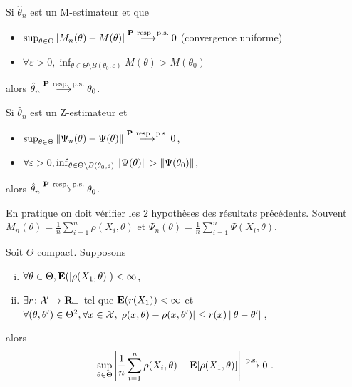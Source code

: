 	\begin{pop}
		Si $\hat{\theta}_n$ est un M-estimateur et que
		\begin{itemize}
			\item[\textbullet] $\sup_{\theta \in \Theta} \left\lvert M_n(\theta) - M(\theta)\right\rvert \overset{\mathbf{P}\ \text{resp. p.s.}}{\longrightarrow} 0$ (convergence uniforme)
			\item[\textbullet] $\forall \varepsilon > 0, \inf_{\theta \in \Theta \setminus B(\theta_0,\varepsilon)} M(\theta) > M(\theta_0)$
		\end{itemize}
		alors $\hat{\theta}_n \overset{\proba\ \text{resp. p.s.}}{\longrightarrow} \theta_0$.
	\end{pop}

	\begin{pop}
		Si $\hat{\theta}_n$ est un Z-estimateur et
		\begin{itemize}
			\item[\textbullet] $\sup_{\theta \in \Theta} \left\lVert \Psi_n(\theta) - \Psi(\theta) \right\rVert \overset{\mathbf{P}\ \text{resp. p.s.}}{\longrightarrow} 0$,
			\item[\textbullet] $\forall \varepsilon > 0, \inf_{\theta \in \Theta \setminus B(\theta_0,\varepsilon)} \left\lVert\Psi(\theta)\right\rVert > \left\lVert\Psi(\theta_0)\right\rVert$,
		\end{itemize}
		alors $\hat{\theta}_n \overset{\proba\ \text{resp. p.s.}}{\longrightarrow} \theta_0$.
	\end{pop}
	
	En pratique on doit vérifier les 2 hypothèses des résultats précédents.
	Souvent $M_n(\theta) = \frac{1}{n} \sum_{i = 1}^n \rho(X_i,\theta)$ et $\Psi_n(\theta) = \frac{1}{n} \sum_{i = 1}^n \Psi(X_i,\theta)$.

	\begin{lem}
		Soit $\Theta$ compact.
		Supposons
		\begin{enumerate}[(i)]
			\item $\forall \theta \in \Theta, \mathbf{E}(\left\lvert\rho(X_1,\theta)\right\rvert) < \infty$,
			\item $\exists r \colon \mathcal{X} \to \mathbf{R}_+$ tel que $\mathbf{E}(r(X_1)) < \infty$ et $\forall (\theta,\theta') \in \Theta^2, \forall x \in \mathcal{X}, \left\lvert\rho(x,\theta) - \rho(x,\theta')\right\rvert \leq r(x) \left\lVert\theta - \theta'\right\rVert$,
		\end{enumerate}
		alors
		$$\sup_{\theta \in \Theta} \abs{\frac{1}{n} \sum_{i = 1}^n \rho(X_i,\theta) - \esp[\rho(X_1,\theta)]} \overset{\text{p.s.}}{\longrightarrow} 0\ .$$
	\end{lem}
	
